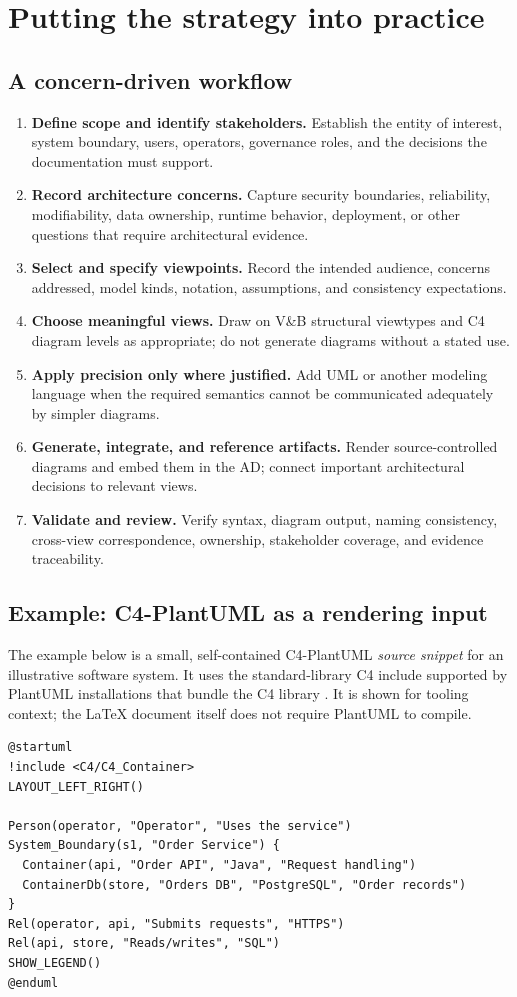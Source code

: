 \documentclass[11pt,letterpaper,oneside]{article}
\begin{document}
\section{Putting the strategy into practice}\label{sec:implementation}
\subsection{A concern-driven workflow}
\begin{enumerate}[label=\textbf{Step \arabic*.}]
\item \textbf{Define scope and identify stakeholders.} Establish the entity of interest, system boundary, users, operators, governance roles, and the decisions the documentation must support.
\item \textbf{Record architecture concerns.} Capture security boundaries, reliability, modifiability, data ownership, runtime behavior, deployment, or other questions that require architectural evidence.
\item \textbf{Select and specify viewpoints.} Record the intended audience, concerns addressed, model kinds, notation, assumptions, and consistency expectations.
\item \textbf{Choose meaningful views.} Draw on V\&B structural viewtypes and C4 diagram levels as appropriate; do not generate diagrams without a stated use.
\item \textbf{Apply precision only where justified.} Add UML or another modeling language when the required semantics cannot be communicated adequately by simpler diagrams.
\item \textbf{Generate, integrate, and reference artifacts.} Render source-controlled diagrams and embed them in the AD; connect important architectural decisions to relevant views.
\item \textbf{Validate and review.} Verify syntax, diagram output, naming consistency, cross-view correspondence, ownership, stakeholder coverage, and evidence traceability.
\end{enumerate}

\subsection{Example: C4-PlantUML as a rendering input}
The example below is a small, self-contained C4-PlantUML \emph{source snippet} for an illustrative software system. It uses the standard-library C4 include supported by PlantUML installations that bundle the C4 library \cite{c4plantuml}. It is shown for tooling context; the LaTeX document itself does not require PlantUML to compile.
\begin{lstlisting}[style=archcode,language={},caption={Example source file: \texttt{diagrams/system-container.puml}}]
@startuml
!include <C4/C4_Container>
LAYOUT_LEFT_RIGHT()

Person(operator, "Operator", "Uses the service")
System_Boundary(s1, "Order Service") {
  Container(api, "Order API", "Java", "Request handling")
  ContainerDb(store, "Orders DB", "PostgreSQL", "Order records")
}
Rel(operator, api, "Submits requests", "HTTPS")
Rel(api, store, "Reads/writes", "SQL")
SHOW_LEGEND()
@enduml
\end{lstlisting}
\end{document}
